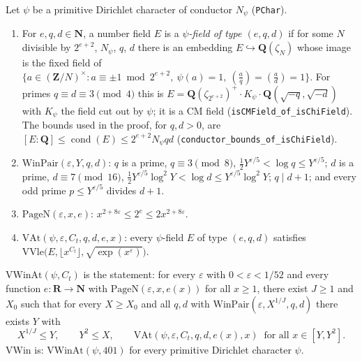 \begin{definition}\label{def:S-chifield}
Let $\psi$ be a primitive Dirichlet character of conductor $N_\psi$ (\texttt{PChar}).
\begin{enumerate}
\item For $e,q,d\in\mathbf N$, a number field $E$ is a \emph{$\psi$-field of type $(e,q,d)$} if for some $N$
divisible by $2^{e+2}$, $N_\psi$, $q$, $d$ there is an embedding $E\hookrightarrow\mathbf{Q}(\zeta_N)$ whose image is the
fixed field of
$\{a\in(\mathbf{Z}/N)^\times : a\equiv\pm1 \bmod 2^{e+2},\ \psi(a)=1,\ (\tfrac{a}{q})=(\tfrac{a}{d})=1\}$.
For primes $q\equiv d\equiv 3 \pmod 4$ this is
$E=\mathbf{Q}(\zeta_{2^{e+2}})^{+}\cdot K_\psi\cdot\mathbf{Q}(\sqrt{-q},\sqrt{-d})$ with $K_\psi$ the field cut out by $\psi$;
it is a CM field (\texttt{isCMField\_of\_isChiField}). The bounds used in the proof,
for $q,d>0$, are $[E:\mathbf Q]\le\operatorname{cond}(E)\le 2^{e+2}N_\psi qd$
(\texttt{conductor\_bounds\_of\_isChiField}).
\item $\mathrm{WinPair}(\varepsilon,Y,q,d)$: $q$ is a prime, $q\equiv 3 \pmod 8$,
$\tfrac12Y^{\varepsilon/5}<\log q\le Y^{\varepsilon/5}$; $d$ is a prime, $d\equiv 7\pmod{16}$,
$\tfrac12Y^{\varepsilon/5}\log^2Y<\log d\le Y^{\varepsilon/5}\log^2Y$; $q\mid d+1$; and every odd prime
$p\le Y^{\varepsilon/5}$ divides $d+1$.
\item $\mathrm{PageN}(\varepsilon,x,e)$: $x^{2+8\varepsilon}\le 2^{e}\le 2x^{2+8\varepsilon}$.
\item $\mathrm{VAt}(\psi,\varepsilon,C_t,q,d,e,x)$: every $\psi$-field $E$ of type $(e,q,d)$ satisfies
$\mathrm{VVle}\bigl(E,\lfloor x^{C_t}\rfloor,\sqrt{\exp(x^{\varepsilon})}\bigr)$.
\end{enumerate}
\end{definition}

\begin{definition}\label{def:S-vwin}
$\mathrm{VWinAt}(\psi,C_t)$ is the statement: for every $\varepsilon$ with $0<\varepsilon<1/52$ and every function
$e:\mathbf{R}\to\mathbf{N}$ with $\mathrm{PageN}(\varepsilon,x,e(x))$ for all $x\ge1$, there exist $J\ge 1$ and $X_0$ such that
for every $X\ge X_0$ and all $q,d$ with $\mathrm{WinPair}(\varepsilon,X^{1/J},q,d)$ there exists $Y$ with
\[
   X^{1/J}\le Y,\qquad Y^2\le X,\qquad \mathrm{VAt}(\psi,\varepsilon,C_t,q,d,e(x),x)\ \text{ for all } x\in[Y,Y^2].
\]
$\mathrm{VWin}$ is: $\mathrm{VWinAt}(\psi,401)$ for every primitive Dirichlet character $\psi$.
\end{definition}

